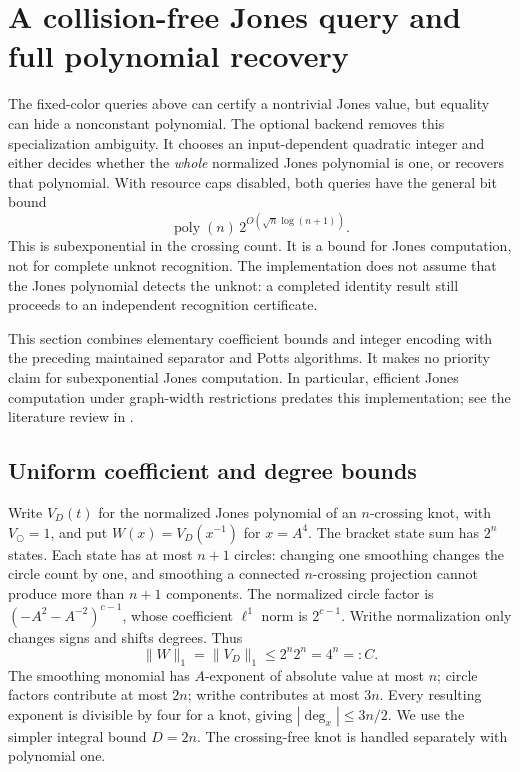 \section{A collision-free Jones query and full polynomial recovery}
\label{sec:faithful-jones}

The fixed-color queries above can certify a nontrivial Jones value, but equality
can hide a nonconstant polynomial.  The optional  backend
removes this specialization ambiguity.  It chooses an input-dependent quadratic
integer and either decides whether the \emph{whole} normalized Jones polynomial
is one, or recovers that polynomial.  With resource caps disabled, both queries
have the general bit bound
\[
 \operatorname{poly}(n)\,2^{O(\sqrt n\log(n+1))}.
\]
This is subexponential in the crossing count.  It is a bound for Jones
computation, not for complete unknot recognition.  The implementation does not
assume that the Jones polynomial detects the unknot: a completed identity
result still proceeds to an independent recognition certificate.

This section combines elementary coefficient bounds and integer encoding with
the preceding maintained separator and Potts algorithms.  It makes no priority
claim for subexponential Jones computation.  In particular, efficient Jones
computation under graph-width restrictions predates this implementation; see
the literature review in .

\subsection{Uniform coefficient and degree bounds}

Write $V_D(t)$ for the normalized Jones polynomial of an $n$-crossing knot,
with $V_{\bigcirc}=1$, and put $W(x)=V_D(x^{-1})$ for $x=A^4$.
The bracket state sum has $2^n$ states.  Each state has at most $n+1$ circles:
changing one smoothing changes the circle count by one, and smoothing a
connected $n$-crossing projection cannot produce more than $n+1$ components.
The normalized circle factor is $(-A^2-A^{-2})^{c-1}$, whose coefficient
$\ell^1$ norm is $2^{c-1}$.  Writhe normalization only changes signs and
shifts degrees.  Thus
\[
 \|W\|_1=\|V_D\|_1\le 2^n 2^n=4^n=:C.
\]
The smoothing monomial has $A$-exponent of absolute value at most $n$;
circle factors contribute at most $2n$; writhe contributes at most $3n$.
Every resulting exponent is divisible by four for a knot, giving
$|\deg_x|\le 3n/2$.  We use the simpler integral bound $D=2n$.
The crossing-free knot is handled separately with polynomial one.

